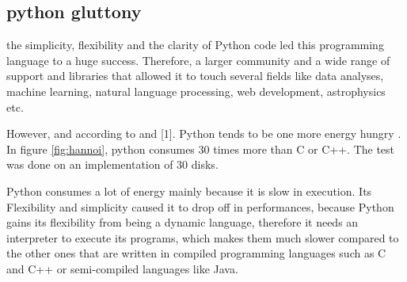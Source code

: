 




\subsection{python gluttony}

the simplicity, flexibility and the clarity of Python code led this programming language to a huge success. Therefore, a larger community and a wide range of support and libraries that allowed it to touch several fields like data analyses, machine learning, natural language processing, web development, astrophysics etc.

However, and according to \cite{pinto_energy_2017,noureddine_preliminary_2012} and [1]. Python tends to be one more energy hungry . In figure \ref{fig:hannoi}, python consumes 30 times more than C or C++. The test was done on an implementation of   30 disks.

Python consumes a lot of energy mainly because it is slow in execution. Its Flexibility and simplicity caused it to drop off in performances, because Python gains its flexibility from being a dynamic language, therefore it needs an interpreter to execute its programs, which makes them much slower compared to the other ones that are written in compiled programming languages such as C and C++ or semi-compiled languages like Java.

